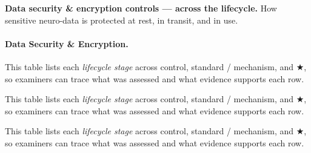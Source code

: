 \noindent\textbf{Data security \& encryption controls --- across the lifecycle.} How sensitive neuro-data is protected at rest, in transit, and in use.

\paragraph{Data Security \& Encryption.}



\noindent This table lists each \textit{lifecycle stage} across control, standard / mechanism, and $\bigstar$, so examiners can trace what was assessed and what evidence supports each row.



\noindent This table lists each \textit{lifecycle stage} across control, standard / mechanism, and $\bigstar$, so examiners can trace what was assessed and what evidence supports each row.


\noindent This table lists each \textit{lifecycle stage} across control, standard / mechanism, and $\bigstar$, so examiners can trace what was assessed and what evidence supports each row.



